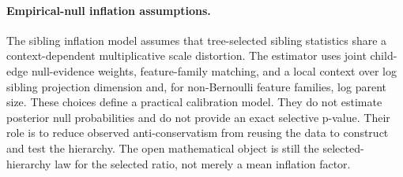 \paragraph{Empirical-null inflation assumptions.}
The sibling inflation model assumes that tree-selected sibling statistics
share a context-dependent multiplicative scale distortion. The estimator uses
joint child-edge null-evidence weights, feature-family matching, and a local
context over log sibling projection dimension and, for non-Bernoulli feature
families, log parent size. These choices define a practical calibration model.
They do not estimate posterior null probabilities and do not provide an exact
selective p-value. Their role is to reduce observed anti-conservatism from
reusing the data to construct and test the hierarchy. The open mathematical
object is still the selected-hierarchy law for the selected ratio, not merely a
mean inflation factor.

